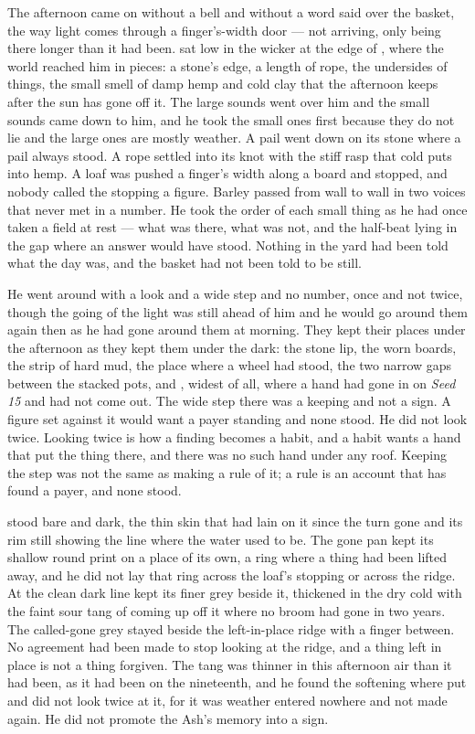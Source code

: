 The afternoon came on without a bell and without a word said over the basket, the way light comes through a finger's-width door --- not arriving, only being there longer than it had been.  sat low in the wicker at the edge of , where the world reached him in pieces: a stone's edge, a length of rope, the undersides of things, the small smell of damp hemp and cold clay that the afternoon keeps after the sun has gone off it. The large sounds went over him and the small sounds came down to him, and he took the small ones first because they do not lie and the large ones are mostly weather. A pail went down on its stone where a pail always stood. A rope settled into its knot with the stiff rasp that cold puts into hemp. A loaf was pushed a finger's width along a board and stopped, and nobody called the stopping a figure. Barley passed from wall to wall in two voices that never met in a number. He took the order of each small thing as he had once taken a field at rest --- what was there, what was not, and the half-beat lying in the gap where an answer would have stood. Nothing in the yard had been told what the day was, and the basket had not been told to be still.

He went around  with a look and a wide step and no number, once and not twice, though the going of the light was still ahead of him and he would go around them again then as he had gone around them at morning. They kept their places under the afternoon as they kept them under the dark: the stone lip, the worn boards, the strip of hard mud, the place where a wheel had stood, the two narrow gaps between the stacked pots, and , widest of all, where a hand had gone in on \emph{Seed 15} and had not come out. The wide step there was a keeping and not a sign. A figure set against it would want a payer standing and none stood. He did not look twice. Looking twice is how a finding becomes a habit, and a habit wants a hand that put the thing there, and there was no such hand under any roof. Keeping the step was not the same as making a rule of it; a rule is an account that has found a payer, and none stood.

 stood bare and dark, the thin skin that had lain on it since the turn gone and its rim still showing the line where the water used to be. The gone pan kept its shallow round print on a place of its own, a ring where a thing had been lifted away, and he did not lay that ring across the loaf's stopping or across the ridge. At  the clean dark line kept its finer grey beside it, thickened in the dry cold with the faint sour tang of  coming up off it where no broom had gone in two years. The called-gone grey stayed beside the left-in-place ridge with a finger between. No agreement had been made to stop looking at the ridge, and a thing left in place is not a thing forgiven. The tang was thinner in this afternoon air than it had been, as it had been on the nineteenth, and he found the softening where put and did not look twice at it, for it was weather entered nowhere and not made again. He did not promote the Ash's memory into a sign.

